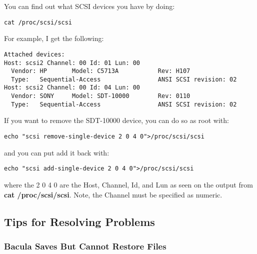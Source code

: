 You can find out what SCSI devices you have by doing: 

\footnotesize
\begin{verbatim}
cat /proc/scsi/scsi
\end{verbatim}
\normalsize

For example, I get the following: 

\footnotesize
\begin{verbatim}
Attached devices:
Host: scsi2 Channel: 00 Id: 01 Lun: 00
  Vendor: HP       Model: C5713A           Rev: H107
  Type:   Sequential-Access                ANSI SCSI revision: 02
Host: scsi2 Channel: 00 Id: 04 Lun: 00
  Vendor: SONY     Model: SDT-10000        Rev: 0110
  Type:   Sequential-Access                ANSI SCSI revision: 02
\end{verbatim}
\normalsize

If you want to remove the SDT-10000 device, you can do so as root with: 

\footnotesize
\begin{verbatim}
echo "scsi remove-single-device 2 0 4 0">/proc/scsi/scsi
\end{verbatim}
\normalsize

and you can put add it back with: 

\footnotesize
\begin{verbatim}
echo "scsi add-single-device 2 0 4 0">/proc/scsi/scsi
\end{verbatim}
\normalsize

where the 2 0 4 0 are the Host, Channel, Id, and Lun as seen on the output
from {\bf cat /proc/scsi/scsi}. Note, the Channel must be specified as
numeric. 
\label{problems1}

\subsection*{Tips for Resolving Problems}

\label{CannotRestore}

\subsubsection*{Bacula Saves But Cannot Restore Files}

